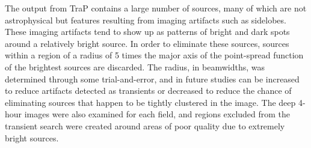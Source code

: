 \documentclass[12pt]{article}
\begin{document}
The output from TraP contains a large number of sources, many of which are not astrophysical but features resulting from imaging artifacts such as sidelobes. These imaging artifacts tend to show up as patterns of bright and dark spots around a relatively bright source. In order to eliminate these sources, sources within a region of a radius of 5 times the major axis of the point-spread function of the brightest sources are discarded. The radius, in beamwidths, was determined through some trial-and-error, and in future studies can be increased to reduce artifacts detected as transients or decreased to reduce the chance of eliminating sources that happen to be tightly clustered in the image. The deep 4-hour images were also examined for each field, and regions excluded from the transient search were created around areas of poor quality due to extremely bright sources. 
\end{document}
